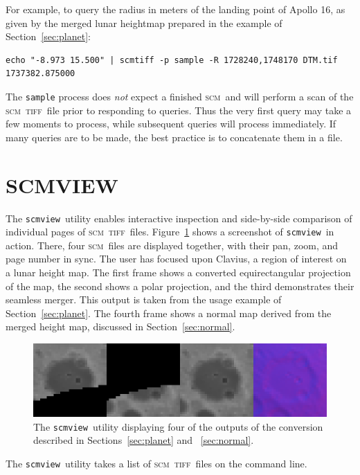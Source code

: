 \documentclass[oneside,10pt]{memoir}
\newcommand{\scm}     {\textsc{scm}}
\newcommand{\tiff}    {\textsc{tiff}}
\newcommand{\scmview} {\texttt{scmview}}
\begin{document}
\begin{Spacing}{1.1}
For example, to query the radius in meters of the landing point of Apollo 16, as given by the merged lunar heightmap prepared in the example of Section~\ref{sec:planet}:

\begin{Verbatim}
echo "-8.973 15.500" | scmtiff -p sample -R 1728240,1748170 DTM.tif
1737382.875000
\end{Verbatim}

The \texttt{sample} process does \emph{not} expect a finished \scm\ and will perform a scan of the \scm\ \tiff\ file prior to responding to queries. Thus the very first query may take a few moments to process, while subsequent queries will process immediately. If many queries are to be made, the best practice is to concatenate them in a file.

\section{SCMVIEW}

The \scmview\ utility enables interactive inspection and side-by-side comparison of individual pages of \scm\ \tiff\ files. Figure~\ref{fig:scmview} shows a screenshot of \scmview\ in action. There, four \scm\ files are displayed together, with their pan, zoom, and page number in sync. The user has focused upon Clavius, a region of interest on a lunar height map. The first frame shows a converted equirectangular projection of the map, the second shows a polar projection, and the third demonstrates their seamless merger. This output is taken from the usage example of Section~\ref{sec:planet}. The fourth frame shows a normal map derived from the merged height map, discussed in Section~\ref{sec:normal}.

\begin{figure}
  \centering
  \includegraphics[width=\textwidth]{fig/scmview.png}
  \caption{The \scmview\ utility displaying four of the outputs of the conversion described in Sections~\ref{sec:planet} and ~\ref{sec:normal}.}
  \label{fig:scmview}
\end{figure}

The \scmview\ utility takes a list of \scm\ \tiff\ files on the command line.


\end{Spacing}
\end{document}
